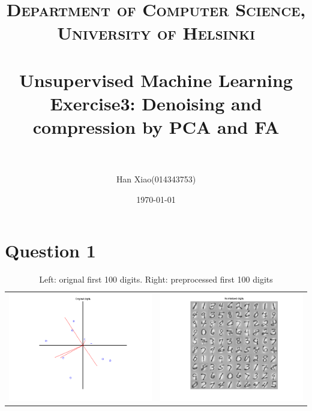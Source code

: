 \documentclass[paper=a4, fontsize=11pt]{scrartcl} %
\title{
\normalfont \normalsize
\textsc{Department of Computer Science, University of Helsinki} \\ [25pt] %
\horrule{0.5pt} \\[0.4cm] %
\huge Unsupervised Machine Learning \newline Exercise3: Denoising and compression by PCA and FA \\ %
\horrule{2pt} \\[0.5cm] %
}
\author{Han Xiao(014343753)} %
\date{\normalsize\today} %
\numberwithin{equation}{section} %
\numberwithin{figure}{section} %
\numberwithin{table}{section} %
\begin{document}
\maketitle %


\section{Question 1}

\begin{table}[H]
\caption{Left: orignal first 100 digits. \newline Right: preprocessed first 100 digits}
\centering
\begin{tabular}{cc}
  \includegraphics[scale=.4]{original_digits} &
  \includegraphics[scale=.4]{normalized_digits}
\end {tabular}
\end {table}
\end{document}
